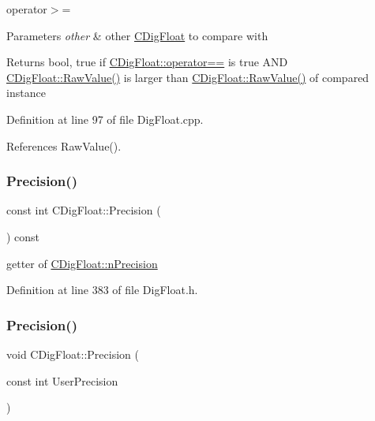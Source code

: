 operator$>$= 


\begin{DoxyParams}{Parameters}
{\em other} & other \hyperlink{classCDigFloat}{C\+Dig\+Float} to compare with \\
\hline
\end{DoxyParams}
\begin{DoxyReturn}{Returns}
bool, true if \hyperlink{classCDigFloat_ad8980d984bf2bab71d15b830fd0180a5}{C\+Dig\+Float\+::operator==} is true A\+ND \hyperlink{classCDigFloat_ab6d3001a549d7496156321cbb26dde51}{C\+Dig\+Float\+::\+Raw\+Value()} is larger than \hyperlink{classCDigFloat_ab6d3001a549d7496156321cbb26dde51}{C\+Dig\+Float\+::\+Raw\+Value()} of compared instance 
\end{DoxyReturn}


Definition at line 97 of file Dig\+Float.\+cpp.



References Raw\+Value().

\mbox{\label{classCDigFloat_a95875f6f7246debee0d00b0c41c82aee}} 
\subsubsection{\texorpdfstring{Precision()}{Precision()}\hspace{0.1cm}{\footnotesize\ttfamily [1/2]}}
{\footnotesize\ttfamily const int C\+Dig\+Float\+::\+Precision (\begin{DoxyParamCaption}{ }\end{DoxyParamCaption}) const\hspace{0.3cm}{\ttfamily [inline]}}



getter of \hyperlink{classCDigFloat_ad580654be35246d14c91482581c0bc11}{C\+Dig\+Float\+::n\+Precision} 



Definition at line 383 of file Dig\+Float.\+h.

\mbox{\label{classCDigFloat_a6d12203e256d0fba602b3cfec37f96a6}} 
\subsubsection{\texorpdfstring{Precision()}{Precision()}\hspace{0.1cm}{\footnotesize\ttfamily [2/2]}}
{\footnotesize\ttfamily void C\+Dig\+Float\+::\+Precision (\begin{DoxyParamCaption}\item[{const int}]{User\+Precision }\end{DoxyParamCaption})\hspace{0.3cm}{\ttfamily [inline]}}




